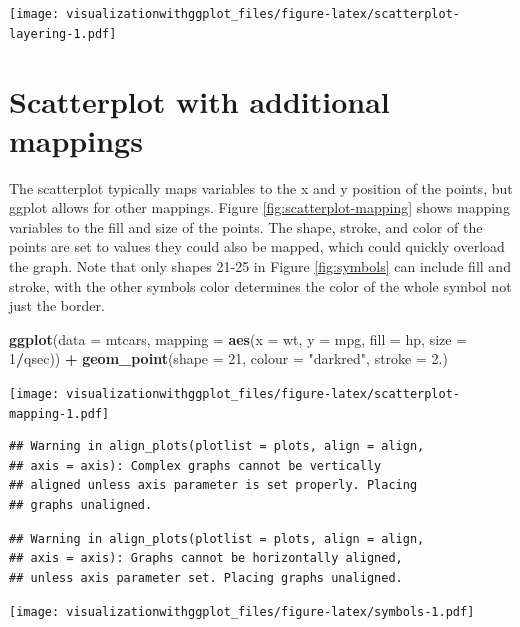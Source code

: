 \documentclass[]{krantz}
\makeatletter
\newenvironment{Shaded}{\begin{snugshade}}{\end{snugshade}}
\newcommand{\KeywordTok}[1]{\textcolor[rgb]{0.13,0.29,0.53}{\textbf{#1}}}
\newcommand{\DataTypeTok}[1]{\textcolor[rgb]{0.13,0.29,0.53}{#1}}
\newcommand{\DecValTok}[1]{\textcolor[rgb]{0.00,0.00,0.81}{#1}}
\newcommand{\StringTok}[1]{\textcolor[rgb]{0.31,0.60,0.02}{#1}}
\newcommand{\OperatorTok}[1]{\textcolor[rgb]{0.81,0.36,0.00}{\textbf{#1}}}
\newcommand{\NormalTok}[1]{#1}
\newenvironment{kframe}{%
\medskip{}
\setlength{\fboxsep}{.8em}
 \def\at@end@of@kframe{}%
 \ifinner\ifhmode%
  \def\at@end@of@kframe{\end{minipage}}%
  \begin{minipage}{\columnwidth}%
 \fi\fi%
 \def\FrameCommand##1{\hskip\@totalleftmargin \hskip-\fboxsep
 \colorbox{shadecolor}{##1}\hskip-\fboxsep
     \hskip-\linewidth \hskip-\@totalleftmargin \hskip\columnwidth}%
 \MakeFramed {\advance\hsize-\width
   \@totalleftmargin\z@ \linewidth\hsize
   \@setminipage}}%
 {\par\unskip\endMakeFramed%
 \at@end@of@kframe}
\renewenvironment{Shaded}{\begin{kframe}}{\end{kframe}}
\theoremstyle{definition}
\theoremstyle{definition}
\theoremstyle{definition}
\theoremstyle{remark}
\makeatother
\begin{document}
\texttt{[image: visualizationwithggplot\_files/figure-latex/scatterplot-layering-1.pdf]}

\section{Scatterplot with additional
mappings}\label{scatterplot-with-additional-mappings}

The scatterplot typically maps variables to the x and y position of the
points, but ggplot allows for other mappings. Figure
\ref{fig:scatterplot-mapping} shows mapping variables to the fill and
size of the points. The shape, stroke, and color of the points are set
to values they could also be mapped, which could quickly overload the
graph. Note that only shapes 21-25 in Figure \ref{fig:symbols} can
include fill and stroke, with the other symbols color determines the
color of the whole symbol not just the border.

\begin{Shaded}
\begin{Highlighting}[]
\KeywordTok{ggplot}\NormalTok{(}\DataTypeTok{data =}\NormalTok{ mtcars, }\DataTypeTok{mapping =} \KeywordTok{aes}\NormalTok{(}\DataTypeTok{x =}\NormalTok{ wt, }\DataTypeTok{y =}\NormalTok{ mpg, }\DataTypeTok{fill =}\NormalTok{ hp, }\DataTypeTok{size =} \DecValTok{1}\OperatorTok{/}\NormalTok{qsec)) }\OperatorTok{+}\StringTok{ }
\StringTok{  }\KeywordTok{geom_point}\NormalTok{(}\DataTypeTok{shape =} \DecValTok{21}\NormalTok{, }\DataTypeTok{colour =} \StringTok{"darkred"}\NormalTok{, }\DataTypeTok{stroke =} \DecValTok{2}\NormalTok{.) }
\end{Highlighting}
\end{Shaded}

\texttt{[image: visualizationwithggplot\_files/figure-latex/scatterplot-mapping-1.pdf]}

\begin{verbatim}
## Warning in align_plots(plotlist = plots, align = align,
## axis = axis): Complex graphs cannot be vertically
## aligned unless axis parameter is set properly. Placing
## graphs unaligned.
\end{verbatim}

\begin{verbatim}
## Warning in align_plots(plotlist = plots, align = align,
## axis = axis): Graphs cannot be horizontally aligned,
## unless axis parameter set. Placing graphs unaligned.
\end{verbatim}

\texttt{[image: visualizationwithggplot\_files/figure-latex/symbols-1.pdf]}
\end{document}
